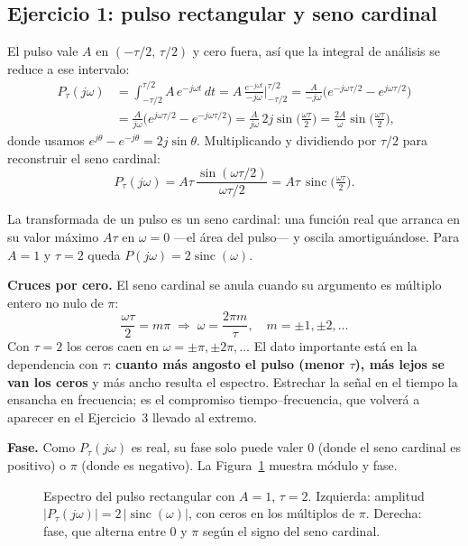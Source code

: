 \documentclass[10pt,a4paper]{article}
\begin{document}
	\subsection*{Ejercicio 1: pulso rectangular y seno cardinal}

	El pulso vale $A$ en $(-\tau/2,\,\tau/2)$ y cero fuera, así que la integral de análisis se reduce a ese intervalo:
	\begin{align*}
		P_\tau(j\omega)
		&= \int_{-\tau/2}^{\tau/2} A\,e^{-j\omega t}\,dt
		= A\,\frac{e^{-j\omega t}}{-j\omega}\bigg|_{-\tau/2}^{\tau/2}
		= \frac{A}{-j\omega}\Big(e^{-j\omega\tau/2} - e^{j\omega\tau/2}\Big) \\
		&= \frac{A}{j\omega}\Big(e^{j\omega\tau/2} - e^{-j\omega\tau/2}\Big)
		= \frac{A}{j\omega}\,2j\sin\!\Big(\tfrac{\omega\tau}{2}\Big)
		= \frac{2A}{\omega}\sin\!\Big(\tfrac{\omega\tau}{2}\Big),
	\end{align*}
	donde usamos $e^{j\theta}-e^{-j\theta}=2j\sin\theta$. Multiplicando y dividiendo por $\tau/2$ para reconstruir el seno cardinal:
	\[
		\boxed{P_\tau(j\omega) = A\tau\,\frac{\sin(\omega\tau/2)}{\omega\tau/2} = A\tau\,\operatorname{sinc}\!\Big(\tfrac{\omega\tau}{2}\Big).}
	\]

	La transformada de un pulso es un seno cardinal: una función real que arranca en su valor máximo $A\tau$ en $\omega=0$ ---el área del pulso--- y oscila amortiguándose. Para $A=1$ y $\tau=2$ queda $P(j\omega)=2\operatorname{sinc}(\omega)$.

	\textbf{Cruces por cero.} El seno cardinal se anula cuando su argumento es múltiplo entero no nulo de $\pi$:
	\[
		\frac{\omega\tau}{2} = m\pi \;\Rightarrow\; \omega = \frac{2\pi m}{\tau}, \quad m=\pm1,\pm2,\dots
	\]
	Con $\tau=2$ los ceros caen en $\omega=\pm\pi,\pm2\pi,\dots$ El dato importante está en la dependencia con $\tau$: \textbf{cuanto más angosto el pulso (menor $\tau$), más lejos se van los ceros} y más ancho resulta el espectro. Estrechar la señal en el tiempo la ensancha en frecuencia; es el compromiso tiempo--frecuencia, que volverá a aparecer en el Ejercicio~3 llevado al extremo.

	\textbf{Fase.} Como $P_\tau(j\omega)$ es real, su fase solo puede valer $0$ (donde el seno cardinal es positivo) o $\pi$ (donde es negativo). La Figura~\ref{fig:sol_ej1} muestra módulo y fase.

	\begin{figure}[H]
		\centering
		
		\caption{Espectro del pulso rectangular con $A=1$, $\tau=2$. Izquierda: amplitud $|P_\tau(j\omega)|=2\,|\!\operatorname{sinc}(\omega)|$, con ceros en los múltiplos de $\pi$. Derecha: fase, que alterna entre $0$ y $\pi$ según el signo del seno cardinal.}
		\label{fig:sol_ej1}
	\end{figure}
\end{document}
